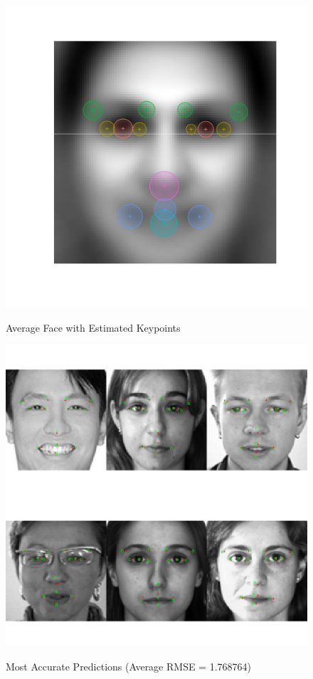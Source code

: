 \documentclass[journal]{IEEEtran}
\begin{document}
\begin{figure}[!htb]
  \centering
  \caption{Average Face with Estimated Keypoints}
  \includegraphics[scale=.49]{avg_face_rmse.pdf}
  \label{fig:avg_face_rmse}
\end{figure}

\begin{figure}[!htb]
  \centering
  \caption{Most Accurate Predictions (Average RMSE = 1.768764)}
  \includegraphics[scale=.49]{best_faces.pdf}
  \label{fig:best_faces}
\end{figure}
\end{document}
